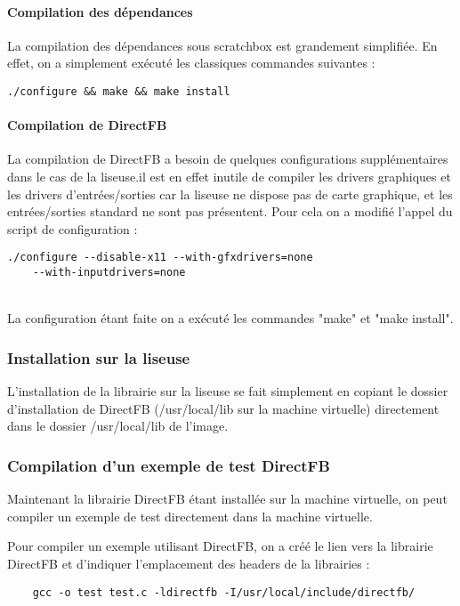 \paragraph{Compilation des dépendances \\}

La compilation des dépendances sous scratchbox est grandement simplifiée. En effet, on a simplement exécuté les classiques commandes suivantes : 
	\begin{lstlisting}
./configure && make && make install
	\end{lstlisting}

\paragraph{Compilation de DirectFB \\}

La compilation de DirectFB a besoin de quelques configurations supplémentaires dans le cas de la liseuse.il est en effet inutile de compiler les drivers graphiques et les drivers d'entrées/sorties car la liseuse ne dispose pas de carte graphique, et les entrées/sorties standard ne sont pas présentent.
Pour cela on a modifié l'appel du script de configuration : 
\begin{lstlisting}
./configure --disable-x11 --with-gfxdrivers=none 
	--with-inputdrivers=none
\end{lstlisting}
~\\
La configuration étant faite on a exécuté les commandes "make" et "make install".

\subsubsection{Installation sur la liseuse}

L'installation de la librairie sur la liseuse se fait simplement en copiant le dossier d'installation de DirectFB 
(/usr/local/lib sur la machine virtuelle) directement dans le dossier /usr/local/lib de l'image.

\subsubsection{Compilation d'un exemple de test DirectFB}

Maintenant la librairie DirectFB étant installée sur la machine virtuelle, on peut compiler un exemple de test directement dans la machine virtuelle.

Pour compiler un exemple utilisant DirectFB, on a créé le lien vers la librairie DirectFB et d'indiquer l'emplacement des headers de la librairies : 
\begin{lstlisting}
	gcc -o test test.c -ldirectfb -I/usr/local/include/directfb/
\end{lstlisting}

